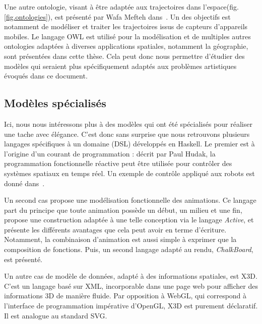 \documentclass[french,12pt]{article}
\begin{document}
Une autre ontologie, visant à être adaptée aux trajectoires dans l'espace(fig.\ref{fig.ontologies}), est présenté par Wafa Mefteh dans~\cite{mefteh_approche_2013}. Un des objectifs est notamment de modéliser et traiter les trajectoires issus de capteurs d'appareils mobiles. Le langage OWL est utilisé pour la modélisation et de multiples autres ontologies adaptées à diverses applications spatiales, notamment la géographie, sont présentées dans cette thèse. Cela peut donc nous permettre d'étudier des modèles qui seraient plus spécifiquement adaptés aux problèmes artistiques évoqués dans ce document.


\subsection{Modèles spécialisés}
Ici, nous nous intéressons plus à des modèles qui ont été spécialisés pour réaliser 
une tache avec élégance. C'est donc sans surprise que nous retrouvons plusieurs 
langages spécifiques à un domaine (DSL) développés en Haskell.
Le premier est à l'origine d'un courant de programmation : décrit par Paul Hudak, 
la programmation fonctionnelle réactive peut être utilisée pour contrôler des 
systèmes spatiaux en temps réel. Un exemple de contrôle appliqué aux robots est donné dans~\cite{hudak_arrows_2003}.

Un second cas propose une modélisation fonctionnelle des animations\cite{matlage_every_2011}. Ce langage part du principe que toute animation possède un début, un milieu et une fin, propose une construction adaptée à une telle conception via le langage \textit{Active}, et présente les différents avantages que cela peut avoir en terme d'écriture. Notamment, la combinaison d'animation est aussi simple à exprimer que la composition de fonctions. Puis, un second langage adapté au rendu, \textit{ChalkBoard}, est présenté.


Un autre cas de modèle de données, adapté à des informations spatiales, est X3D\cite{jankowski_declarative_2013}. C'est un langage basé sur XML, incorporable dans une page web pour afficher des informations 3D de manière fluide. Par opposition à WebGL, qui correspond à l'interface de programmation impérative d'OpenGL, X3D est purement déclaratif. Il est analogue au standard SVG.
\end{document}
